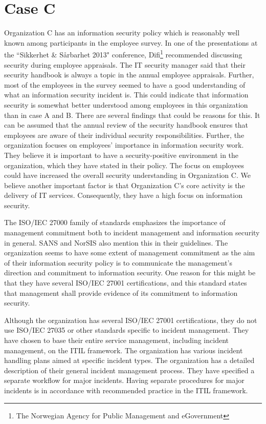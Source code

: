 \section{Case C}
\label{sec:discussionCaseC}
Organization C has an information security policy which is reasonably well known among participants in the employee survey. In one of the presentations at the ``Sikkerhet \& S\aa rbarhet 2013" conference, Difi\footnote{The Norwegian Agency for Public Management and eGovernment} recommended discussing security during employee appraisals. The IT security manager said that their security handbook is always a topic in the annual employee appraisals. Further, most of the employees in the survey seemed to have a good understanding of what an information security incident is. This could indicate that information security is somewhat better understood among employees in this organization than in case A and B. There are several findings that could be reasons for this. It can be assumed that the annual review of the security handbook ensures that employees are aware of their individual security responsibilities. Further, the organization focuses on employees' importance in information security work. They believe it is important to have a security-positive environment in the organization, which they have stated in their policy. The focus on employees could have increased the overall security understanding in Organization C. We believe another important factor is that Organization C's core activity is the delivery of IT services. Consequently, they have a high focus on information security.

The ISO/IEC 27000 family of standards emphasizes the importance of management commitment both to incident management and information security in general. SANS and NorSIS also mention this in their guidelines. The organization seems to have some extent of management commitment as the aim of their information security policy is to communicate the management's direction and commitment to information security. One reason for this might be that they have several ISO/IEC 27001 certifications, and this standard states that management shall provide evidence of its commitment to information security. %

Although the organization has several ISO/IEC 27001 certifications, they do not use ISO/IEC 27035 or other standards specific to incident management. They have chosen to base their entire service management, including incident management, on the ITIL framework. The organization has various incident handling plans aimed at specific incident types. The organization has a detailed description of their general incident management process. They have specified a separate workflow for major incidents. Having separate procedures for major incidents is in accordance with recommended practice in the ITIL framework. 
 
